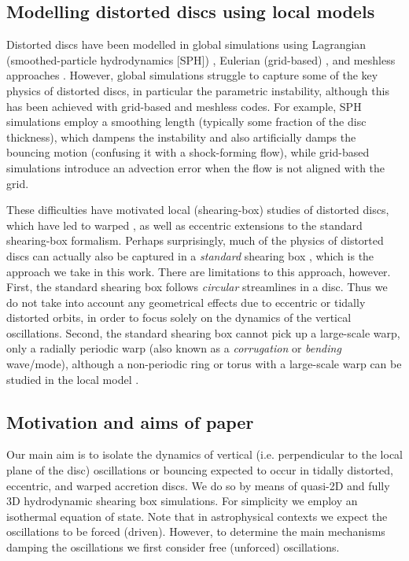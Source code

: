 \documentclass[fleqn,usenatbib]{mnras}
\begin{document}
\subsection{Modelling distorted discs using local models}

Distorted discs have been modelled in global simulations using Lagrangian (smoothed-particle hydrodynamics [SPH]) \citep{lodato2010diffusive,nealon2022bardeen,deng2022non}, Eulerian (grid-based) \citep{kimmig2024warped}, and %
meshless approaches \citep{deng2021parametric,deng2022non}. However, global simulations struggle to capture some of the key physics of distorted discs, in particular the parametric instability, although this has been achieved with grid-based \citep{2020MNRAS.496.2849P} and meshless \citep{deng2021parametric} codes. For example, SPH simulations employ a smoothing length (typically some fraction of the disc thickness), which dampens the instability and also artificially damps the bouncing motion (confusing it with a shock-forming flow), while grid-based simulations introduce an advection error when the flow is not aligned with the grid.

These difficulties have motivated local (shearing-box) studies of distorted discs, which have led to warped \citep{ogilvie2013local, paardekooper2019local}, as well as eccentric \citep{ogilvie2014local, wienkers2018non} extensions to the standard shearing-box formalism. Perhaps surprisingly, much of the physics of distorted discs can actually also be captured in a \textit{standard} shearing box \citep{ogilvie2022hydrodynamics}, which is the approach we take in this work. There are limitations to this approach, however. First, the standard shearing box follows \textit{circular} streamlines in a disc. Thus we do not take into account any geometrical effects due to eccentric or tidally distorted orbits, in order to focus solely on the dynamics of the vertical oscillations. Second, the standard shearing box cannot pick up a large-scale warp, only a radially periodic warp (also known as a \textit{corrugation} or \textit{bending} wave/mode), although a non-periodic ring or torus with a large-scale warp can be studied in the local model \citep{fairbairn2021non}.


\subsection{Motivation and aims of paper}
Our main aim is to isolate the dynamics of vertical (i.e. perpendicular to the local plane of the disc) oscillations or bouncing expected to occur in tidally distorted, eccentric, and warped accretion discs. We do so by means of quasi-2D and fully 3D hydrodynamic shearing box simulations. For simplicity we employ an isothermal equation of state. Note that in astrophysical contexts we expect the oscillations to be forced (driven). However, to determine the main mechanisms damping the oscillations we first consider free (unforced) oscillations.
\end{document}
